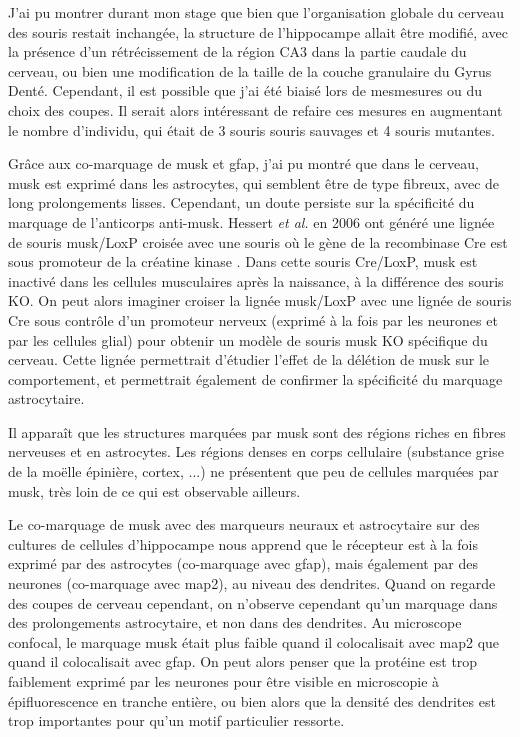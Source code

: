 J'ai pu montrer durant mon stage que bien que l'organisation globale du cerveau des souris \mcrd restait inchangée, la structure de l'hippocampe allait être modifié, avec la présence d'un rétrécissement de la région CA3 dans la partie caudale du cerveau, ou bien une modification de la taille de la couche granulaire du Gyrus Denté. Cependant, il est possible que j'ai été biaisé lors de mesmesures ou du choix des coupes. Il serait alors intéressant de refaire ces mesures en augmentant le nombre d'individu, qui était de 3 souris souris sauvages et 4 souris mutantes.

Grâce aux co-marquage de \gls{musk} et \gls{gfap}, j'ai pu montré que dans le cerveau, \gls{musk} est exprimé dans les astrocytes, qui semblent être de type fibreux, avec de long prolongements lisses. Cependant, un doute persiste sur la spécificité du marquage de l'anticorps anti-\gls{musk}. Hessert \emph{et al.} en 2006 ont généré une lignée de souris \gls{musk}/LoxP croisée avec une souris où le gène de la recombinase Cre est sous promoteur de la créatine kinase \cite{Hesser2006}. Dans cette souris Cre/LoxP, \gls{musk} est inactivé dans les cellules musculaires après la naissance, à la différence des souris KO. On peut alors imaginer croiser la lignée \gls{musk}/LoxP avec une lignée de souris Cre sous contrôle d'un promoteur nerveux (exprimé à la fois par les neurones et par les cellules glial) pour obtenir un modèle de souris \gls{musk} KO spécifique du cerveau. Cette lignée permettrait d'étudier l'effet de la délétion de \gls{musk} sur le comportement, et permettrait également de confirmer la spécificité du marquage astrocytaire.

Il apparaît que les structures marquées par \gls{musk} sont des régions riches en fibres nerveuses et en astrocytes. Les régions denses en corps cellulaire (substance grise de la moëlle épinière, cortex, ...) ne présentent que peu de cellules marquées par \gls{musk}, très loin de ce qui est observable ailleurs.

Le co-marquage de \gls{musk} avec des marqueurs neuraux et astrocytaire sur des cultures de cellules d'hippocampe nous apprend que le récepteur est à la fois exprimé par des astrocytes (co-marquage avec \gls{gfap}), mais également par des neurones (co-marquage avec \gls{map2}), au niveau des dendrites. Quand on regarde des coupes de cerveau cependant, on n'observe cependant qu'un marquage dans des prolongements astrocytaire, et non dans des dendrites. Au microscope confocal, le marquage \gls{musk} était plus faible quand il colocalisait avec \gls{map2} que quand il colocalisait avec \gls{gfap}. On peut alors penser que la protéine est trop faiblement exprimé par les neurones pour être visible en microscopie à épifluorescence en tranche entière, ou bien alors que la densité des dendrites est trop importantes pour qu'un motif particulier ressorte. 

